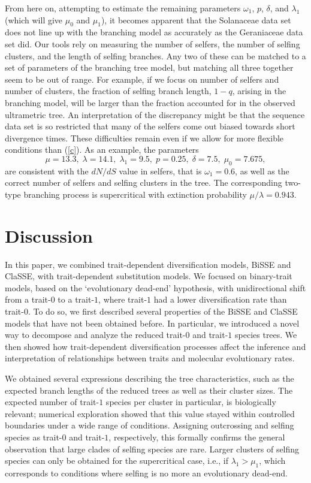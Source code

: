 \documentclass[a4paper,11pt]{article}
\theoremstyle{plain}
\theoremstyle{definition}
\numberwithin{equation}{section}
\begin{document}
From here on, attempting to estimate the remaining parameters
 $\omega_1$, $p$, $\delta$, and $\lambda_1$ (which will give $\mu_0$
and $\mu_1$), it becomes apparent that the Solanaceae data set does not line up
with the branching model as accurately as the Geraniaceae data set did.  Our tools
rely on measuring the number of selfers, the number of selfing clusters, and
the length of selfing branches.  Any two of these can be matched to a set of
parameters of the branching tree model, but matching all three
together seem to be out of range. For example, if we
focus on number of selfers and number of clusters, the 
fraction of selfing branch length, $1-q$, arising in the branching
model, will be larger than the fraction accounted for in the observed
ultrametric tree.  An interpretation of the discrepancy might be that
the sequence data set is so restricted that many of the selfers come
out biased towards short divergence times. These difficulties remain even if we
allow for more flexible conditions than (\ref{c}). As an example, the parameters
\[
\mu=13.3,\;  \lambda=14.1,\; \lambda_1=9.5,\;  p=0.25,\;  \delta=7.5,\;  \mu_0=7.675,
\]
are consistent with the $dN/dS$ value in selfers, that is $\omega_1=0.6$, as well as the
correct number of selfers and selfing clusters in the tree. 
The corresponding two-type branching process is supercritical with
extinction probability $\mu/\lambda= 0.943$. 




\section{Discussion}



In this paper, we combined trait-dependent 
diversification models, BiSSE and ClaSSE, with 
trait-dependent substitution models. We focused 
on binary-trait models, based on the `evolutionary 
dead-end' hypothesis, with unidirectional shift 
from a trait-$0$ to a trait-$1$, where trait-$1$ 
had a lower diversification rate than trait-$0$. 
To do so, we first described several properties 
of the BiSSE and ClaSSE models that have not 
been obtained before. In particular, we introduced 
a novel way to decompose and analyze the reduced 
trait-$0$ and trait-$1$ species trees. We then showed how 
trait-dependent diversification processes affect the 
inference and interpretation of relationships between 
traits and molecular evolutionary rates.



We obtained several expressions describing the tree 
characteristics, such as the expected branch lengths 
of the reduced trees as well as their cluster sizes. 
The expected number of trait-$1$ species per cluster in particular, 
is biologically relevant; numerical exploration showed 
that this value stayed within controlled boundaries under a 
wide range of conditions. Assigning outcrossing and selfing 
species as trait-$0$ and trait-$1$, respectively, this formally 
confirms the general observation that large clades of selfing 
species are rare. Larger clusters of selfing species can only 
be obtained for the supercritical case, i.e., if $\lambda_1>\mu_1$, 
which corresponds to conditions where 
selfing is no more an evolutionary dead-end.
\end{document}
